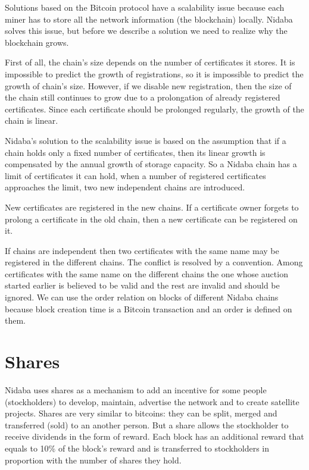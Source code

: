 \documentclass[12pt]{article}
\begin{document}
Solutions based on the Bitcoin protocol have a scalability issue because each miner has to store all the network information (the blockchain) locally. Nidaba solves this issue, but before we describe a solution we need to realize why the blockchain grows.

First of all, the chain's size depends on the number of certificates it stores. It is impossible to predict the growth of registrations, so it is impossible to predict the growth of chain's size. However, if we disable new registration, then the size of the chain still continues to grow due to a prolongation of already registered certificates. Since each certificate should be prolonged regularly, the growth of the chain is linear.

Nidaba's solution to the scalability issue is based on the assumption that if a chain holds only a fixed number of certificates, then its linear growth is compensated by the annual growth of storage capacity. So a Nidaba chain has a limit of certificates it can hold, when a number of registered certificates approaches the limit, two new independent chains are introduced.

New certificates are registered in the new chains. If a certificate owner forgets to prolong a certificate in the old chain, then a new certificate can be registered on it.

If chains are independent then two certificates with the same name may be registered in the different chains. The conflict is resolved by a convention. Among certificates with the same name on the different chains the one whose auction started earlier is believed to be valid and the rest are invalid and should be ignored. We can use the order relation on blocks of different Nidaba chains because block creation time is a Bitcoin transaction and an order is defined on them.

\section{Shares}

Nidaba uses shares as a mechanism to add an incentive for some people (stockholders) to develop, maintain, advertise the network and to create satellite projects. Shares are very similar to bitcoins: they can be split, merged and transferred (sold) to an another person. But a share allows the stockholder to receive dividends in the form of reward. Each block has an additional reward that equals to 10\% of the block's reward and is transferred to stockholders in proportion with the number of shares they hold.
\end{document}
